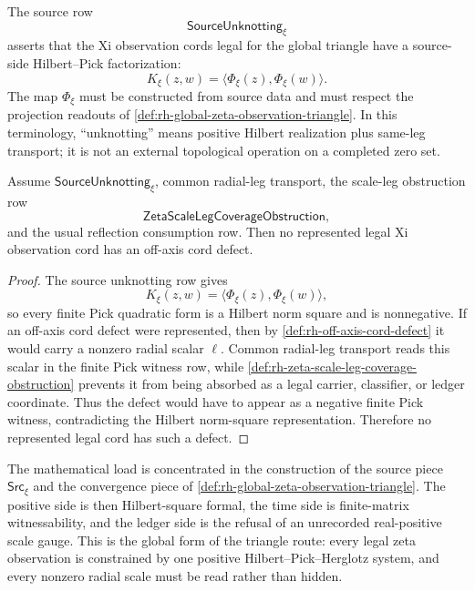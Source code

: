 \begin{definition}
\label{def:rh-source-unknotting-xi}
The source row
$$
\mathsf{SourceUnknotting}_{\xi}
$$
asserts that the Xi observation cords legal for the global triangle have
a source-side Hilbert--Pick factorization:
$$
K_{\xi}(z,w)=\langle\Phi_{\xi}(z),\Phi_{\xi}(w)\rangle.
$$
The map $\Phi_{\xi}$ must be constructed from source data and must
respect the projection readouts of
\autoref{def:rh-global-zeta-observation-triangle}.  In this terminology,
``unknotting'' means positive Hilbert realization plus same-leg
transport; it is not an external topological operation on a completed
zero set.
\end{definition}

\begin{theorem}
\label{thm:rh-source-unknotting-excludes-off-axis-cord-defects}
Assume $\mathsf{SourceUnknotting}_{\xi}$, common radial-leg transport,
the scale-leg obstruction row
$$
\mathsf{ZetaScaleLegCoverageObstruction},
$$
and the usual reflection consumption row.  Then no represented legal Xi
observation cord has an off-axis cord defect.
\end{theorem}

\begin{proof}
The source unknotting row gives
$$
K_{\xi}(z,w)=\langle\Phi_{\xi}(z),\Phi_{\xi}(w)\rangle,
$$
so every finite Pick quadratic form is a Hilbert norm square and is
nonnegative.  If an off-axis cord defect were represented, then by
\autoref{def:rh-off-axis-cord-defect} it would carry a nonzero radial
scalar $\ell$.  Common radial-leg transport reads this scalar in the
finite Pick witness row, while
\autoref{def:rh-zeta-scale-leg-coverage-obstruction} prevents it from
being absorbed as a legal carrier, classifier, or ledger coordinate.
Thus the defect would have to appear as a negative finite Pick witness,
contradicting the Hilbert norm-square representation.  Therefore no
represented legal cord has such a defect.
\end{proof}

\begin{principle}
\label{prin:rh-global-observation-source-load}
The mathematical load is concentrated in the construction of the source
piece $\mathsf{Src}_{\xi}$ and the convergence piece of
\autoref{def:rh-global-zeta-observation-triangle}.  The positive side
is then Hilbert-square formal, the time side is finite-matrix
witnessability, and the ledger side is the refusal of an unrecorded
real-positive scale gauge.  This is the global form of the triangle
route: every legal zeta observation is constrained by one positive
Hilbert--Pick--Herglotz system, and every nonzero radial scale must be
read rather than hidden.
\end{principle}
